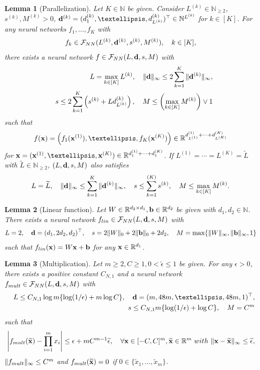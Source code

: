 \documentclass[10pt,a4paper]{amsart}
\newtheorem{lemma}{Lemma}
\newcommand{\bb}{{\bf b}}
\newcommand{\bbN}{{\mathbb N}}
\newcommand{\bbR}{{\mathbb R}}
\newcommand{\bd}{{\bf d}}
\newcommand{\bean}{\setlength\arraycolsep{1pt}\begin{eqnarray*}}
\newcommand{\bx}{{\bf x}}
\def\cF{\mathcal F}
\newcommand{\eean}{\end{eqnarray*}}
\begin{document}
\begin{lemma}[Parallelization]
\label{secnn:par}
Let $K \in \bbN$ be given. Consider $L^{(k)} \in \bbN_{\geq 2}$, $ s^{(k)}, M^{(k)} > 0$, $\bd^{(k)} = (d_1^{(k)},\ldots,d_{L^{(k)}}^{(k)})^{\top} \in \bbN^{L^{(k)}}$ for $k \in [K]$.
For any neural networks $f_1,\ldots,f_{K}$ with 
\bean
f_k \in \cF_{\rm NN} (L^{(k)}, \bd^{(k)}, s^{(k)}, M^{(k)} ), \quad k \in [K],
\eean
there exists a neural network $f \in \cF_{\rm NN}(L,\bd,s,M)$ with 
\bean
&& L = \max_{k \in [K]} L^{(k)}, \quad \|\bd\|_{\infty} \leq 2 \sum_{k=1}^{K} \|\bd^{(k)}\|_{\infty},
\\
&& s \leq 2\sum_{k=1}^{K} \left(s^{(k)} + L d_{L^{(k)}}^{(k)} \right), \quad M \leq \left(\max_{k \in [K]} M^{(k)} \right) \vee 1
\eean
such that
\bean
f(\bx) = \left( f_1(\bx^{(1)}),\ldots, f_K(\bx^{(K)}) \right) \in \bbR^{d_{L^{(1)}}^{(1)} + \cdots + d_{L^{(K)}}^{(K)}}
\eean
for $\bx = (\bx^{(1)},\ldots,\bx^{(K)}) \in \bbR^{d_1^{(1)}+\cdots+d_{1}^{(K)} }$. If $L^{(1)} = \cdots = L^{(K)} = \widetilde L$ with $\widetilde L \in \bbN_{\geq 2}$, $(L,\bd,s,M)$ also satisfies
\bean
L = \widetilde L, \quad \|\bd\|_{\infty} \leq \sum_{k=1}^{K} \|\bd^{(k)}\|_{\infty}, \quad s \leq \sum_{k=1}^{(K)} s^{(k)}, \quad M \leq  \max_{k \in [K]} M^{(k)}.
\eean
\end{lemma}

\begin{lemma}[Linear function]
\label{secnn:lin}
Let $W \in \bbR^{d_2 \times d_1}, \bb \in \bbR^{d_2}$ be given with $d_1,d_2 \in \bbN$. There exists a neural network $f_{\rm lin} \in \cF_{\rm NN}(L,\bd,s,M)$ with
\bean
L = 2, \quad \bd = (d_1,2d_2,d_2)^{\top}, \quad s = 2\|W\|_{0} + 2\|\bb\|_{0} + 2d_2, \quad M = \max\{ \|W\|_{\infty}, \|\bb\|_{\infty}, 1\}
\eean
such that $f_{\rm lin}(\bx) = W\bx + \bb$ for any $\bx \in \bbR^{d_1}$.
\end{lemma}

\begin{lemma}[Multiplication]
\label{secnn:mult}
Let $m \geq 2, C \geq 1, 0 < \widetilde \epsilon \leq 1$ be given. For any $\epsilon > 0$, there exists a positive constant $C_{N,1}$ and a neural network $f_{\rm mult} \in \cF_{\rm NN}(L,\bd,s,M)$ with 
\bean
&& L \leq C_{N,1} \log m \{ \log (1/\epsilon) + m \log C \}, \quad \bd = (m,48m,\ldots,48m,1)^{\top},
\\
&& s \leq C_{N,1} m \{ \log(1/\epsilon) +  \log C \}, \quad M = C^{m}
\eean
such that
\bean
\left\vert f_{\rm mult}(\widetilde \bx) - \prod_{i=1}^{m} x_{i} \right\vert \leq \epsilon + mC^{m-1}\widetilde \epsilon, \quad \forall \bx \in [-C,C]^{m}, \widetilde \bx \in \bbR^{m} \ {\rm with} \ \|\bx-\widetilde \bx\|_{\infty} \leq \widetilde \epsilon,
\eean
$ \| f_{\rm mult} \|_{\infty} \leq C^{m}$ and $f_{\rm mult}(\widetilde \bx) = 0$ if $0 \in \{\widetilde x_1,\ldots,\widetilde x_{m}\}$.
\end{lemma}
\end{document}
